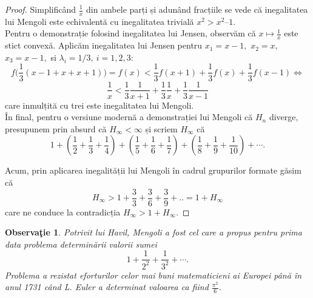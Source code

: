 \documentclass[a4paper,12pt,oneside]{report}
\newtheorem{remark}{Observa\c{t}ie}
\begin{document}
\begin{proof}
Simplificând \(\frac{1}{x}\) din ambele parți și adunând fracțiile se vede că inegalitatea lui Mengoli este echivalentă cu inegalitatea  trivială \(x^{2} >  x^{2} – 1\). \\
Pentru o demonstrație folosind inegalitatea lui Jensen, observăm că \(x \mapsto \frac{1}{x}\) este stict convexă. Aplicăm inegalitatea lui Jensen pentru $x_1=x-1,$ $x_2=x,$ $x_3=x-1,$ si $\lambda_i=1/3,~i=1, 2, 3:$
\[
f\biggl(\frac{1}{3}(x-1+x+x+1)\biggr)=f(x)<\frac{1}{3}f(x+1)+\frac{1}{3}f(x)+\frac{1}{3}f(x-1)\Leftrightarrow
\]
\[
\frac{1}{x}<\frac{1}{3}\frac{1}{x+1}+\frac{1}{3}\frac{1}{x}+\frac{1}{3}\frac{1}{x-1}
\]
care inmulțită cu trei este inegalitatea lui Mengoli.\\
În final, pentru o versiune modernă a demonstrației lui Mengoli că \(H_{n}\) diverge, presupunem prin absurd că \(H_{\infty }< \infty\) și scriem \(H_{\infty }\) că
\begin{displaymath}
  1 + \left ( \frac{1}{2} + \frac{1}{3} + \frac{1}{4} \right ) + \left ( \frac{1}{5} + \frac{1}{6} + \frac{1}{7} \right ) + \left ( \frac{1}{8} + \frac{1}{9} +\frac{1}{10} \right )+\cdots.
\end{displaymath}

Acum, prin aplicarea inegalității lui Mengoli în cadrul grupurilor formate găsim că
\[
H_{\infty }>1 + \frac{3}{3} + \frac{3}{6} + \frac{3}{9} + ..= 1 + H_{\infty }
\]
care ne conduce la contradicția \(H_{\infty } > 1 + H_{\infty }\).
\end{proof}
\begin{remark}
Potrivit lui Havil, Mengoli a fost cel care a propus pentru prima data problema determinării valorii sumei \[1 + \frac{1}{2^{2}} + \frac{1}{3^{2}} + \cdots.\]
Problema a rezistat eforturilor celor mai buni matematicieni ai Europei până în anul 1731 când L. Euler a determinat valoarea ca fiind \(\frac{\pi^{2}}{6}\).
\end{remark}
\end{document}
